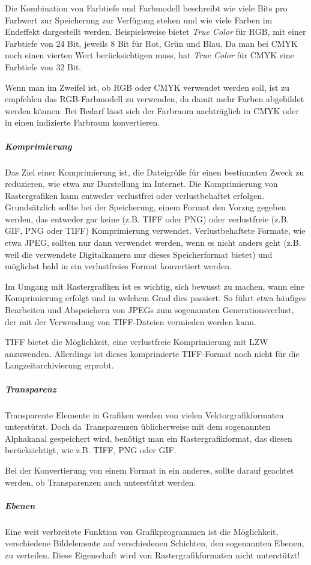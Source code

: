 Die Kombination von Farbtiefe und Farbmodell beschreibt wie viele Bits pro Farbwert zur Speicherung zur Verfügung stehen und wie viele Farben im Endeffekt dargestellt werden. Beispielsweise bietet \emph{True Color} für RGB, mit einer Farbtiefe von 24 Bit, jeweils 8 Bit für Rot, Grün und Blau. Da man bei CMYK noch einen vierten Wert berücksichtigen muss, hat \emph{True Color} für CMYK eine Farbtiefe von 32 Bit.

Wenn man im Zweifel ist, ob RGB oder CMYK verwendet werden soll, ist zu empfehlen das RGB-Farbmodell zu verwenden, da damit mehr Farben abgebildet werden können. Bei Bedarf lässt sich der Farbraum nachträglich in CMYK oder in einen indizierte Farbraum konvertieren.


\subparagraph{Komprimierung}
Das Ziel einer Komprimierung ist, die Dateigröße für einen bestimmten Zweck zu reduzieren, wie etwa zur Darstellung im Internet. Die Komprimierung von Rastergrafiken kann entweder verlustfrei oder verlustbehaftet erfolgen. Grundsätzlich sollte bei der Speicherung, einem Format den Vorzug gegeben werden, das entweder gar keine (z.B. TIFF oder PNG) oder verlustfreie (z.B. GIF, PNG oder TIFF) Komprimierung verwendet. Verlustbehaftete Formate, wie etwa JPEG, sollten nur dann verwendet werden, wenn es nicht anders geht (z.B. weil die verwendete Digitalkamera nur dieses Speicherformat bietet) und möglichst bald in ein verlustfreies Format konvertiert werden.

Im Umgang mit Rastergrafiken ist es wichtig, sich bewusst zu machen, wann eine Komprimierung erfolgt und in welchem Grad dies passiert. So führt etwa häufiges Bearbeiten und Abspeichern von JPEGs zum sogenannten Generationsverlust, der mit der Verwendung von TIFF-Dateien vermieden werden kann.

TIFF bietet die Möglichkeit, eine verlustfreie Komprimierung mit LZW anzuwenden. Allerdings ist dieses komprimierte TIFF-Format noch nicht für die Langzeitarchivierung erprobt.


\subparagraph{Transparenz}

Transparente Elemente in Grafiken werden von vielen Vektorgrafikformaten unterstützt. Doch da Transparenzen üblicherweise mit dem sogenannten Alphakanal gespeichert wird, benötigt man ein Rastergrafikformat, das diesen berücksichtigt, wie z.B. TIFF, PNG oder GIF. 

Bei der Konvertierung von einem Format in ein anderes, sollte darauf geachtet werden, ob Transparenzen auch unterstützt werden.


\subparagraph{Ebenen}
Eine weit verbreitete Funktion von Grafikprogrammen ist die Möglichkeit, verschiedene Bildelemente auf verschiedenen Schichten, den sogenannten Ebenen, zu verteilen. Diese Eigenschaft wird von Rastergrafikformaten nicht unterstützt! 

